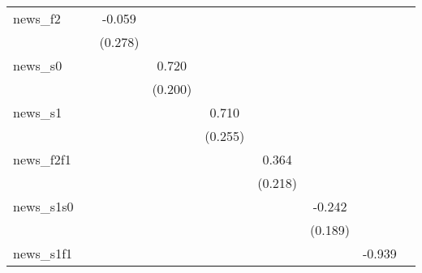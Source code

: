 {\begin{tabular}{l*{8}{c}}
\addlinespace
news\_f2     &                     &      -0.059         &                     &                     &                     &                     &                     &                     \\
            &                     &     (0.278)         &                     &                     &                     &                     &                     &                     \\
\addlinespace
news\_s0     &                     &                     &       0.720\sym{***}&                     &                     &                     &                     &                     \\
            &                     &                     &     (0.200)         &                     &                     &                     &                     &                     \\
\addlinespace
news\_s1     &                     &                     &                     &       0.710\sym{***}&                     &                     &                     &                     \\
            &                     &                     &                     &     (0.255)         &                     &                     &                     &                     \\
\addlinespace
news\_f2f1   &                     &                     &                     &                     &       0.364\sym{*}  &                     &                     &                     \\
            &                     &                     &                     &                     &     (0.218)         &                     &                     &                     \\
\addlinespace
news\_s1s0   &                     &                     &                     &                     &                     &      -0.242         &                     &                     \\
            &                     &                     &                     &                     &                     &     (0.189)         &                     &                     \\
\addlinespace
news\_s1f1   &                     &                     &                     &                     &                     &                     &      -0.939\sym{**} &                     \\

\end{tabular}}
